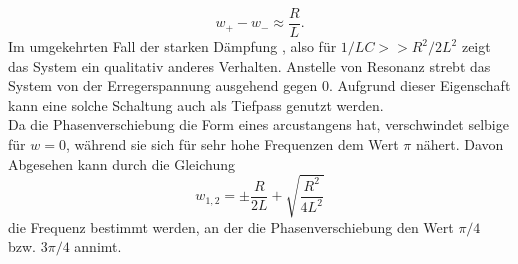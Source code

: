 \begin{equation*}
w_+-w_-\approx \frac{R}{L}.
\end{equation*}
Im umgekehrten Fall der starken Dämpfung , also für $1/LC>>R^2/2L^2$ zeigt das System ein qualitativ anderes Verhalten. Anstelle von Resonanz strebt das System von der Erregerspannung ausgehend gegen $0$. Aufgrund dieser Eigenschaft kann eine solche Schaltung auch als Tiefpass genutzt werden. \\
Da die Phasenverschiebung die Form eines arcustangens hat, verschwindet selbige für $w=0$, während sie sich für sehr hohe Frequenzen dem Wert $\pi$ nähert. Davon Abgesehen kann durch die Gleichung
\begin{equation}
w_{1,2}=\pm \frac{R}{2L}+\sqrt{\frac{R^2}{4L^2}}
\end{equation}
die Frequenz bestimmt werden, an der die Phasenverschiebung den Wert $\pi /4$ bzw. $3\pi/4$ annimt.
